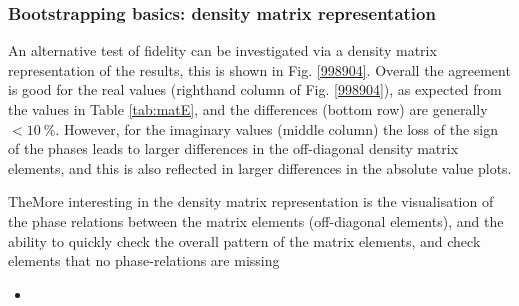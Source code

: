 \subsubsection{Bootstrapping basics: density matrix representation}

An alternative test of fidelity can be investigated via a density matrix representation of the results, this is shown in Fig. \ref{998904}. Overall the agreement is good for the real values (righthand column of Fig. \ref{998904}), as expected from the values in Table \ref{tab:matE}, and the differences (bottom row) are generally $<10~\%$. However, for the imaginary values (middle column) the loss of the sign of the phases leads to larger differences in the off-diagonal density matrix elements, and this is also reflected in larger differences in the absolute value plots.

TheMore interesting in the density matrix representation is the visualisation of the phase relations between the matrix elements (off-diagonal elements), and the ability to quickly check the overall pattern of the matrix elements, and check elements that no phase-relations are missing


\begin{itemize}
\item 
\end{itemize}